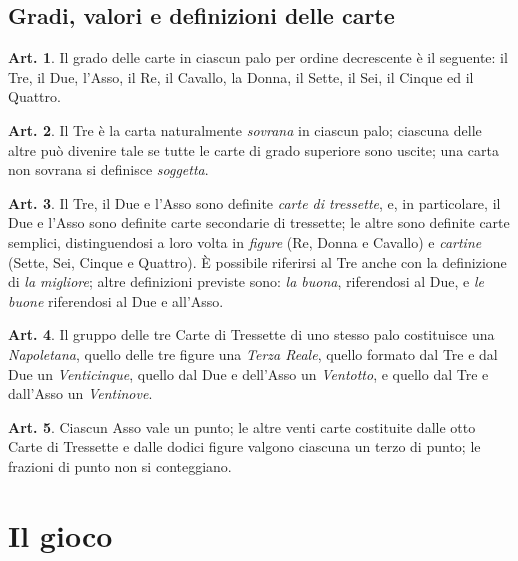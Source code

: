 \documentclass[italian,a4paper]{book}
\theoremstyle{definition}
\newtheorem{art}{Art.}
\begin{document}
\subsection{Gradi, valori e definizioni delle carte}
\begin{art}
    Il grado delle carte in ciascun palo per ordine decrescente è il seguente: il Tre, il Due, l'Asso, il Re, il Cavallo, la Donna, il Sette, il Sei, il Cinque ed il Quattro.
\end{art}
\begin{art}\label{carta.sovrana}
    Il Tre è la carta naturalmente \emph{sovrana} in ciascun palo; ciascuna
    delle altre può divenire tale se tutte le carte di grado superiore sono
    uscite; una carta non sovrana si definisce \emph{soggetta}. 
\end{art}
\begin{art}
    Il Tre, il Due e l'Asso sono definite \emph{carte di tressette}, e, in
    particolare, il Due e l'Asso sono definite carte secondarie di
    tressette; le altre sono definite carte semplici, distinguendosi a loro
    volta in \emph{figure} (Re, Donna e Cavallo) e \emph{cartine} (Sette,
    Sei, Cinque e Quattro). \`E possibile riferirsi al Tre anche con la
    definizione di \emph{la migliore}; altre definizioni previste sono:
    \emph{la buona}, riferendosi al Due, e \emph{le buone} riferendosi al Due e all'Asso.
\end{art}
\begin{art}
    Il gruppo delle tre Carte di Tressette di uno stesso palo costituisce
    una \emph{Napoletana}, quello delle tre figure una \emph{Terza Reale},
    quello formato dal Tre e dal Due un \emph{Venticinque}, quello dal Due e
    dell'Asso un \emph{Ventotto}, e quello dal Tre e dall'Asso un
    \emph{Ventinove}.
\end{art}
\begin{art}
    Ciascun Asso vale un punto; le altre venti carte costituite dalle otto Carte di Tressette e dalle dodici figure valgono ciascuna un terzo di punto; le frazioni di punto non si conteggiano.
\end{art}
\section{Il gioco}
\end{document}
